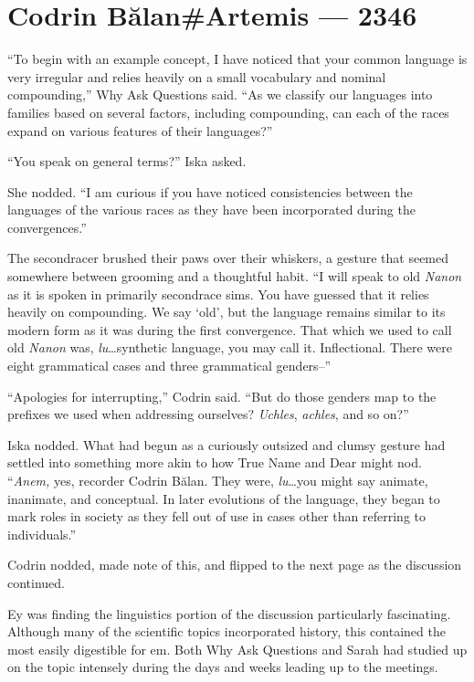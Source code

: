 \hypertarget{codrin-bux103lanartemis-2346}{%
\chapter{Codrin Bălan\#Artemis — 2346}\label{codrin-bux103lanartemis-2346}}

``To begin with an example concept, I have noticed that your common language is very irregular and relies heavily on a small vocabulary and nominal compounding,'' Why Ask Questions said. ``As we classify our languages into families based on several factors, including compounding, can each of the races expand on various features of their languages?''

``You speak on general terms?'' Iska asked.

She nodded. ``I am curious if you have noticed consistencies between the languages of the various races as they have been incorporated during the convergences.''

The secondracer brushed their paws over their whiskers, a gesture that seemed somewhere between grooming and a thoughtful habit. ``I will speak to old \emph{Nanon} as it is spoken in primarily secondrace sims. You have guessed that it relies heavily on compounding. We say `old', but the language remains similar to its modern form as it was during the first convergence. That which we used to call old \emph{Nanon} was, \emph{lu}\ldots synthetic language, you may call it. Inflectional. There were eight grammatical cases and three grammatical genders--''

``Apologies for interrupting,'' Codrin said. ``But do those genders map to the prefixes we used when addressing ourselves? \emph{Uchles}, \emph{achles}, and so on?''

Iska nodded. What had begun as a curiously outsized and clumsy gesture had settled into something more akin to how True Name and Dear might nod. ``\emph{Anem,} yes, recorder Codrin Bălan. They were, \emph{lu}\ldots you might say animate, inanimate, and conceptual. In later evolutions of the language, they began to mark roles in society as they fell out of use in cases other than referring to individuals.''

Codrin nodded, made note of this, and flipped to the next page as the discussion continued.

Ey was finding the linguistics portion of the discussion particularly fascinating. Although many of the scientific topics incorporated history, this contained the most easily digestible for em. Both Why Ask Questions and Sarah had studied up on the topic intensely during the days and weeks leading up to the meetings.

